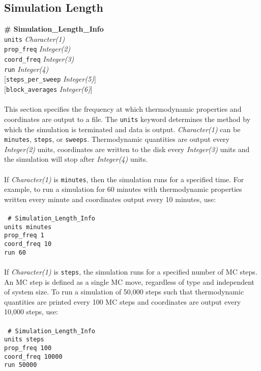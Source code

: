 \subsection{Simulation Length}\label{sec:Simulation_Length_Info}
{\bf \# Simulation\_Length\_Info} \\
{\tt units} {\it Character(1)} \\
{\tt prop\_freq} {\it Integer(2)} \\
{\tt coord\_freq} {\it Integer(3)} \\
{\tt run} {\it Integer(4)} \\
{[}{\tt steps\_per\_sweep} {\it Integer(5)}] \\
{[}{\tt block\_averages} {\it Integer(6)}] \\ \\
%
This section specifies the frequency at which thermodynamic properties and coordinates are output to a file.
The \texttt{units} keyword determines the method by which the simulation is terminated and data is output.
{\it Character(1)} can be {\tt minutes}, {\tt steps}, or {\tt sweeps}.
Thermodynamic quantities are output every {\it Integer(2)} units,
coordinates are written to the disk every {\it Integer(3)} units and
the simulation will stop after {\it Integer(4)} units. \\ \\
%
If {\it Character(1)} is {\tt minutes}, then the simulation runs for a specified time.
For example, to run a simulation for 60 minutes with thermodynamic properties written every minute and
coordinates output every 10 minutes, use: \\ \\
%
\texttt{
\# Simulation\_Length\_Info \\
units         minutes \\
prop\_freq    1 \\
coord\_freq   10 \\
run           60 \\} \\
%
If {\it Character(1)} is {\tt steps}, the simulation runs for a specified number of MC steps.
An MC step is defined as a single MC move, regardless of type and independent of system size.
To run a simulation of 50,000 steps such that thermodynamic quantities are printed every 100 MC steps and
coordinates are output every 10,000 steps, use: \\ \\
%
\texttt{
\# Simulation\_Length\_Info \\
units           steps \\
prop\_freq      100 \\
coord\_freq     10000 \\
run             50000 \\ } \\
